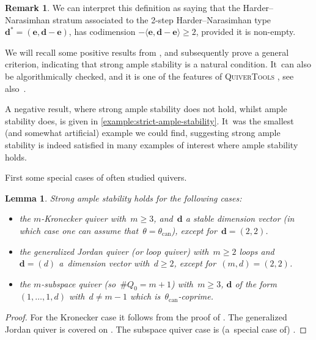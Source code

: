 \documentclass[11pt]{article}
\theoremstyle{plain}
\newtheorem{lemma}[theorem]{Lemma}
\theoremstyle{definition}
\newtheorem{remark}[theorem]{Remark}
\newcommand\can{\ensuremath{\mathrm{can}}}
\newcommand\tuple[1]{\ensuremath{{\boldsymbol{#1}}}}
\begin{document}
\begin{remark}
We can interpret this definition as saying that
the Harder--Nara\-sim\-han stratum
associated to the 2-step Harder--Nara\-sim\-han type~$\tuple{d}^*=(\tuple{e},\tuple{d}-\tuple{e})$,
has codimension $-\langle \tuple{e}, \tuple{d} - \tuple{e} \rangle\geq 2$,
provided it is non-empty.
\end{remark}

We will recall some positive results from \cite{MR3683503,karen},
and subsequently prove a general criterion,
indicating that strong ample stability is a natural condition. It~can also be algorithmically checked,
and it is one of the features of \textsc{QuiverTools} \cite{quivertools},
see also~\cite{2506.19432}.

A negative result,
where strong ample stability does not hold,
whilst ample stability does,
is given in \cref{example:strict-ample-stability}. It~was the smallest
(and somewhat artificial) example
we could find,
suggesting strong ample stability is indeed satisfied in many examples of interest
where ample stability holds.

First some special cases of often studied quivers.
\begin{lemma}
\label{lemma:strong-ample-stability-examples}
Strong ample stability holds for the following cases:
\begin{itemize}
\item the $m$-Kronecker quiver with~$m\geq 3$,
and~$\tuple{d}$ a stable dimension vector
(in which case one can assume that~$\theta=\theta_\can$),
except for~$\tuple{d}=(2,2)$.
\item the generalized Jordan quiver (or loop quiver)
with~$m\geq 2$ loops
and~$\tuple{d}=(d)$ a~dimension vector with~$d\geq 2$,
except for~$(m,d)=(2,2)$.
\item the $m$-subspace quiver (so~$\#Q_0=m+1$) with~$m\geq 3$,
$\tuple{d}$ of the form~$(1,\ldots,1,d)$ with~$d\neq m-1$
which is~$\theta_\can$-coprime.
\end{itemize}
\end{lemma}

\begin{proof}
For the Kronecker case it follows from the proof of \cite[Prop.\,6.2]{MR3683503}.
The generalized Jordan quiver is covered on \cite[p.\,460]{MR3683503}.
The subspace quiver case is (a~special case of) \cite[Th.\,3.3.4]{karen}.
\end{proof}
\end{document}
